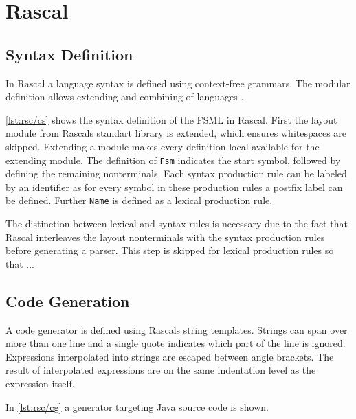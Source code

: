 \section{Rascal}

\subsection{Syntax Definition}

In Rascal a language syntax is defined using context-free grammars.
The modular definition allows extending and combining of languages \cite{van2011rascal}.

\autoref{lst:rsc/cs} shows the syntax definition of the FSML in Rascal.
First the layout module from Rascals standart library is extended, which ensures whitespaces are skipped.
Extending a module makes every definition local available for the extending module.
The definition of \lstinline[language=rascal]{Fsm} indicates the start symbol, followed by defining the remaining nonterminals.
Each syntax production rule can be labeled by an identifier as for every symbol in these production rules a postfix label can be defined.
Further \lstinline{Name} is defined as a lexical production rule.

The distinction between lexical and syntax rules is necessary due to the fact that Rascal interleaves the layout nonterminals with the syntax production rules before generating a parser.
This step is skipped for lexical production rules so that ...



\subsection{Code Generation}
\label{ss:rsc/cg}

A code generator is defined using Rascals string templates.
Strings can span over more than one line and a single quote indicates which part of the line is ignored.
Expressions interpolated into strings are escaped between angle brackets.
The result of interpolated expressions are on the same indentation level as the expression itself.

In \autoref{lst:rsc/cg} a generator targeting Java source code is shown.



